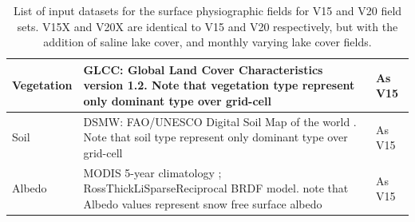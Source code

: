 \documentclass[hess, twostagejnl]{copernicus}
\begin{document}
\begin{table}
\begin{tabularx}{\textwidth}{lXX}
		\hline 
		Vegetation & GLCC: Global Land Cover Characteristics version 1.2. Note that vegetation type represent only dominant type over grid-cell & As V15 \\ 
		\hline
		 Soil & DSMW: FAO/UNESCO Digital Soil Map of the world \citep{FAO}. Note that soil type represent only dominant type over grid-cell & As V15 \\ 
		 \hline 
		 Albedo & MODIS 5-year climatology \citep{SCHAAF2002135}; RossThickLiSparseReciprocal BRDF model. note that Albedo values represent snow free surface albedo & As V15 \\ 
		\bottomrule
	\end{tabularx}
	\caption{List of input datasets for the surface physiographic fields for V15 and V20 field sets. V15X and V20X are identical to V15 and V20 respectively, but with the addition of saline lake cover, and monthly varying lake cover fields.}
	\label{tab:datasources}
\end{table}
\end{document}
